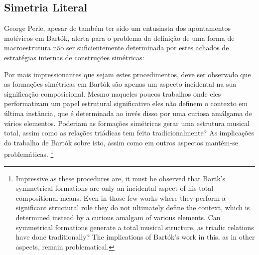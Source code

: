 \documentclass[
	12pt,				%
	openright,			%
	twoside,			%
	a4paper,			%
	english,			%
	french,				%
	spanish,			%
	brazil				%
	]{abntex2}
\begin{document}
%



\subsection{Simetria Literal}
\label{simetrialiteral}


George Perle, apesar de também ter sido um entusiasta dos apontamentos motívicos em Bartók, alerta para o problema da definição de uma forma de macroestrutura não ser suficientemente determinada por estes achados de estratégias internas de construções simétricas:

\begin{citacao}
Por mais impressionantes que sejam estes procedimentos, deve ser observado que as formações simétricas em Bartók são apenas um aspecto incidental na sua significação composicional. Mesmo naqueles poucos trabalhos onde eles performatizam um papel estrutural significativo eles não definem o contexto em última instância, que é determinada ao invés disso por uma curiosa amálgama de vários elementos.
Poderiam as formações simétricas gerar uma estrutura musical total, assim como as relações triádicas tem feito tradicionalmente? As implicações do trabalho de Bartók sobre isto, assim como em outros aspectos mantém-se problemáticas.\cite[p. 300-312]{perle1955symmetrical} \footnote{Impressive as these procedures are, it must be observed that Bartk's symmetrical formations are only an incidental aspect of his total compositional means. Even in those few works where they perform a significant structural role they do not ultimately define the context, which is determined instead by a curious amalgam of various elements. Can symmetrical formations generate a total musical structure, as triadic relations have done traditionally? The implications of Bartók's work in this, as in other aspects, remain problematical.\cite[p. 300-312]{perle1955symmetrical}}
\end{citacao}
\end{document}
